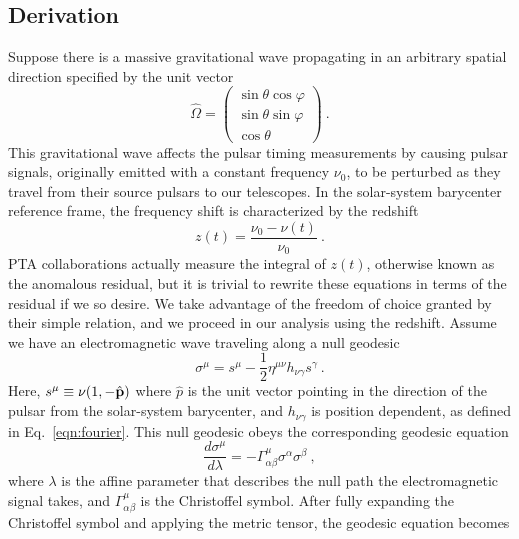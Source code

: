 \documentclass[prd,aps,psfig,nofootinbib,nobibnotes,superscriptaddress,preprintnumbers,times]{revtex4-2}\setlength{\topmargin}{-14mm}
\begin{document}
\subsection{Derivation}\label{subsec:derivation}
Suppose there is a massive gravitational wave propagating in an arbitrary spatial direction specified by the unit vector
\begin{equation}\label{eqn:omega}
    \hat{\Omega} = \begin{pmatrix}
                        \sin\theta \cos\varphi \\
                        \sin\theta \sin\varphi \\
                        \cos\theta
                    \end{pmatrix} \ .
\end{equation}
This gravitational wave affects the pulsar timing measurements by causing pulsar signals, originally emitted with a constant frequency $\nu_0$, to be perturbed as they travel from their source pulsars to our telescopes. In the solar-system barycenter reference frame, the frequency shift is characterized by the redshift
\begin{equation}\label{eqn:z}
    z(t) = \frac{\nu_0 - \nu(t)}{\nu_0} \ .
\end{equation}
PTA collaborations actually measure the integral of $z(t)$, otherwise known as the anomalous residual, but it is trivial to rewrite these equations in terms of the residual if we so desire. We take advantage of the freedom of choice granted by their simple relation, and we proceed in our analysis using the redshift. Assume we have an electromagnetic wave traveling along a null geodesic 
\begin{equation}\label{eqn:null}
    \sigma^\mu = s^\mu - \frac{1}{2} \eta^{\mu\nu}h_{\nu \gamma}s^\gamma \ .
\end{equation}
Here, $s^\mu \equiv \nu (1, -\hat{\bf p})$ where $\hat{p}$ is the unit vector pointing in the direction of the pulsar from the solar-system barycenter, and $h_{\nu \gamma}$ is position dependent, as defined in Eq.\ \ref{eqn:fourier}. This null geodesic obeys the corresponding geodesic equation 
\begin{equation}\label{eqn:geodesic}
    \frac{d\sigma^\mu}{d\lambda} = -\Gamma_{\alpha \beta}^\mu \sigma^\alpha \sigma^\beta \ ,
\end{equation} where $\lambda$ is the affine parameter that describes the null path the electromagnetic signal takes, and $\Gamma_{\alpha \beta}^\mu$ is the Christoffel symbol. After fully expanding the Christoffel symbol and applying the metric tensor, the geodesic equation becomes  
\end{document}

